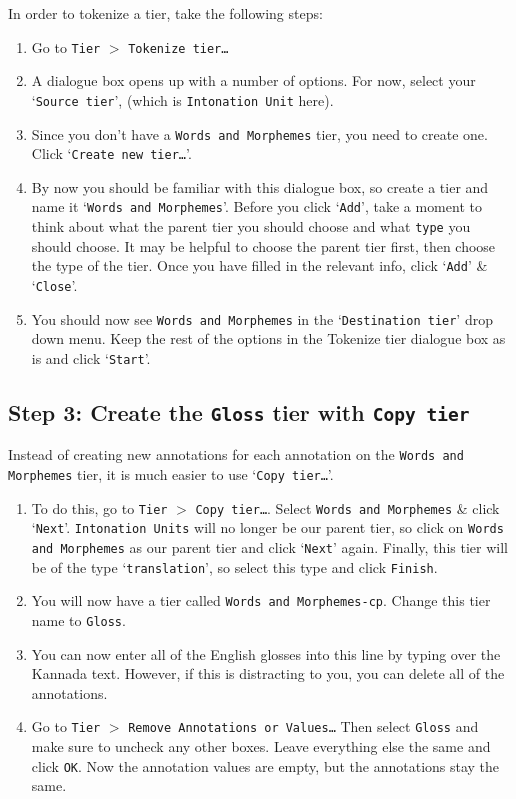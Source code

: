 \documentclass[letterpaper,12pt]{article}
\begin{document}
\noindent In order to tokenize a tier, take the following steps:
  \begin{enumerate}
    \item Go to \texttt{Tier} $>$ \texttt{Tokenize tier\ldots}
    \item A dialogue box opens up with a number of options. For now, select your `\texttt{Source tier}', (which is \texttt{Intonation Unit} here). 
    \item Since you don't have a \texttt{Words and Morphemes} tier, you need to create one. Click `\texttt{Create new tier\ldots}'.
    \item By now you should be familiar with this dialogue box, so create a tier and name it `\texttt{Words and Morphemes}'. Before you click `\texttt{Add}', take a moment to think about what the parent tier you should choose and what \texttt{type} you should choose. It may be helpful to choose the parent tier first, then choose the type of the tier. Once you have filled in the relevant info, click `\texttt{Add}' \& `\texttt{Close}'.
    \item You should now see \texttt{Words and Morphemes} in the `\texttt{Destination tier}' drop down menu. Keep the rest of the options in the Tokenize tier dialogue box as is and click `\texttt{Start}'.
  \end{enumerate} 
 
\subsection*{Step 3: Create the \texttt{Gloss} tier with \texttt{Copy tier}}
Instead of creating new annotations for each annotation on the \texttt{Words and Morphemes} tier, it is much easier to use `\texttt{Copy tier\ldots}'.  
\begin{enumerate}
\item To do this, go to \texttt{Tier} $>$ \texttt{Copy tier\ldots}. Select \texttt{Words and Morphemes} \& click `\texttt{Next}'. \texttt{Intonation Units} will no longer be our parent tier, so click on \texttt{Words and Morphemes} as our parent tier and click `\texttt{Next}' again. Finally, this tier will be of the type `\texttt{translation}', so select this type and click \texttt{Finish}.
\item You will now have a tier called \texttt{Words and Morphemes-cp}. Change this tier name to \texttt{Gloss}.
\item You can now enter all of the English glosses into this line by typing over the Kannada text. However, if this is distracting to you, you can delete all of the annotations. 
\item Go to \texttt{Tier} $>$ \texttt{Remove Annotations or Values\ldots} Then select \texttt{Gloss} and make sure to uncheck any other boxes. Leave everything else the same and click \texttt{OK}. Now the annotation values are empty, but the annotations stay the same. 
\end{enumerate}
\end{document}
